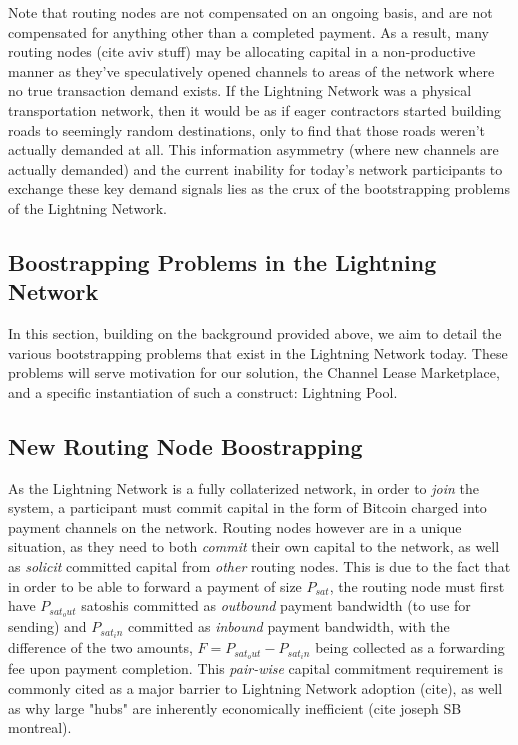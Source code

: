 \documentclass[12pt,a4paper]{article}
\theoremstyle{definition}
\begin{document}
 Note that routing nodes are not compensated on an ongoing basis, and are not
 compensated for anything other than a completed payment. As a result, many
 routing nodes (cite aviv stuff) may be allocating capital in a non-productive
 manner as they've speculatively opened channels to areas of the network where
 no true transaction demand exists. If the Lightning Network was a physical
 transportation network, then it would be as if eager contractors started
 building roads to seemingly random destinations, only to find that those roads
 weren't actually demanded at all. This information asymmetry (where new
 channels are actually demanded) and the current inability for today's network
 participants to exchange these key demand signals lies as the crux of the
 bootstrapping problems of the Lightning Network.


\subsection{Boostrapping Problems in the Lightning Network}

In this section, building on the background provided above, we aim to detail
the various bootstrapping problems that exist in the Lightning Network today.
These problems will serve motivation for our solution, the Channel Lease
Marketplace, and a specific instantiation of such a construct: Lightning Pool.


\subsection{New Routing Node Boostrapping}

As the Lightning Network is a fully collaterized network, in order to
\emph{join} the system, a participant must commit capital in the form of
Bitcoin charged into payment channels on the network. Routing nodes however are
in a unique situation, as they need to both \emph{commit} their own capital to
the network, as well as \emph{solicit} committed capital from \emph{other}
routing nodes. This is due to the fact that in order to be able to forward a
payment of size $P_{sat}$, the routing node must first have $P_{sat_out}$
satoshis committed as \emph{outbound} payment bandwidth (to use for sending)
and $P_{sat_in}$ committed as \emph{inbound} payment bandwidth, with the
difference of the two amounts, $F= P_{sat_out} -  P_{sat_in}$ being collected
as a forwarding fee upon payment completion. This \emph{pair-wise} capital
commitment requirement is commonly cited as a major barrier to Lightning
Network adoption (cite), as well as why large "hubs" are inherently
economically inefficient (cite joseph SB montreal).
\end{document}
